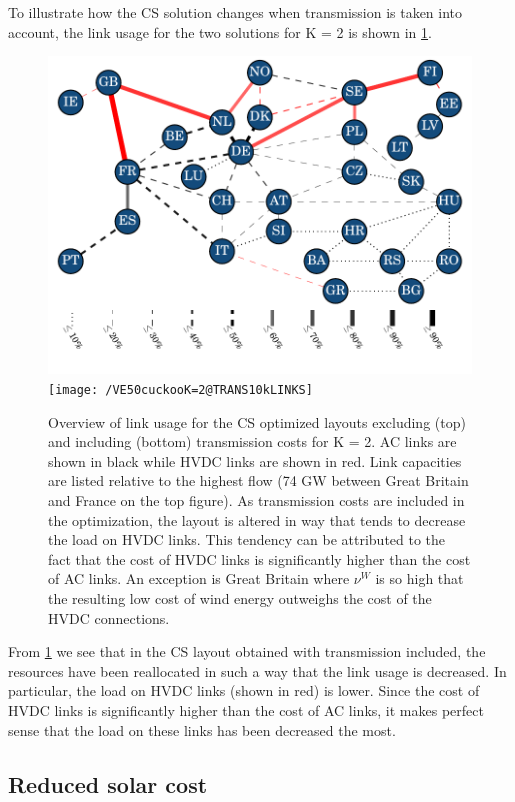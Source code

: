 \documentclass[a4paper, 12pt, sort&compress]{elsarticle}%
\begin{document}
To illustrate how the CS solution changes when transmission is taken
into account, the link usage for the two solutions for K = 2 is shown
in \cref{fig:links}.

\begin{figure}[h!]
  \centering
  \includegraphics[width = 0.8\columnwidth]{VE50cuckooK=2@defaultLINKS}
  \texttt{[image: /VE50cuckooK=2@TRANS10kLINKS]}
  \caption{Overview of link usage for the CS optimized layouts
    excluding (top) and including (bottom) transmission costs for K =
    2. AC links are shown in black while HVDC links are shown in
    red. Link capacities are listed relative to the highest flow (74
    GW between Great Britain and France on the top figure). As
    transmission costs are included in the optimization, the layout is
    altered in way that tends to decrease the load on HVDC links. This
    tendency can be attributed to the fact that the cost of HVDC links
    is significantly higher than the cost of AC links. An exception is
    Great Britain where $\nu^{W}$ is so high that the resulting low cost
    of wind energy outweighs the cost of the HVDC connections.}
  \label{fig:links}
\end{figure}

From \cref{fig:links} we see that in the CS layout obtained with
transmission included, the resources have been reallocated in such a
way that the link usage is decreased. In particular, the load on HVDC
links (shown in red) is lower. Since the cost of HVDC links is
significantly higher than the cost of AC links, it makes perfect sense
that the load on these links has been decreased the most.

\FloatBarrier

\subsection{Reduced solar cost}
\label{sec:reduced-solar-cost}
\end{document}
